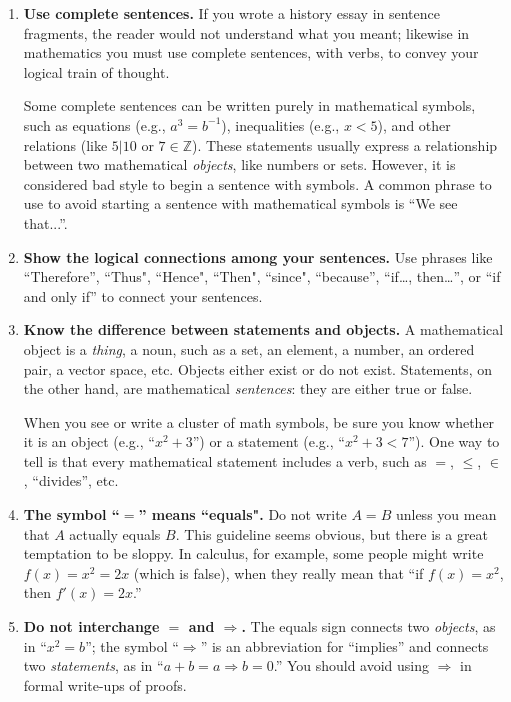 \documentclass[11pt]{article}
\renewcommand{\implies}{\Longrightarrow}
\begin{document}
\begin{enumerate}
\item \textbf{Use complete sentences.}
If you wrote a history essay in sentence fragments, the reader would not understand what you meant; likewise in mathematics you must use complete sentences, with verbs, to convey your logical train of thought.
        
Some complete sentences can be written purely in mathematical symbols, such as equations (e.g., $a^3=b^{-1}$), inequalities (e.g., $x<5$), and other relations (like $5\big|10$ or $7\in\mathbb{Z}$). These statements usually express a relationship between two mathematical \emph{objects}, like numbers or sets.  However, it is considered bad style to begin a sentence with symbols.  A common phrase to use to avoid starting a sentence with mathematical symbols is ``We see that...''.

\item \textbf{Show the logical connections among your sentences.}
Use phrases like ``Therefore'', ``Thus", ``Hence", ``Then", ``since", ``because'', ``if\ldots, then\ldots'', or ``if and only if'' to connect your sentences.
  
\item \textbf{Know the difference between statements and objects.}
A mathematical object is a \emph{thing}, a noun, such as a set, an element, a number, an ordered pair, a vector space, etc. Objects either exist or do not exist. Statements, on the other hand, are mathematical \emph{sentences}:  they are either true or false.
        
When you see or write a cluster of math symbols, be sure you know whether it is an object (e.g., ``$x^2+3$'') or a statement (e.g., ``$x^2+3<7$''). One way to tell is that every mathematical statement includes a verb, such as $=$, $\leq$, $\in$, ``divides'', etc.
        
\item \textbf{The symbol ``$=$'' means ``equals".}
Do not write $A=B$ unless you mean that $A$ actually equals $B$. This guideline seems obvious, but there is a great temptation to be sloppy.  In calculus, for example, some people might write $f(x)=x^{2}=2x$ (which is false), when they really mean that ``if $f(x)=x^{2}$, then $f'(x)=2x$.''

\item \textbf{Do not interchange ${=}$ and ${\implies}$.}
The equals sign connects two \emph{objects}, as in ``$x^2=b$''; the symbol ``$\implies$'' is an abbreviation for ``implies'' and connects two \emph{statements}, as in ``$a+b=a \implies b=0$.''  You should avoid using $\implies$ in formal write-ups of proofs.


\end{enumerate}
\end{document}
